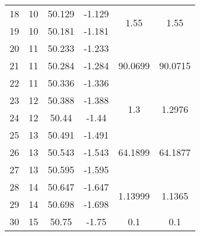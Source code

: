 \documentclass[twocolumn]{autart}
\begin{document}
\begin{table*}[t]
\begin{tabular}{cccccc}
    18    & 10    & 50.129 & -1.129 & \multirow{2}[4]{*}{1.55} & \multirow{2}[4]{*}{1.55} \\
    19    & 10    & 50.181 & -1.181 &       &  \\ \midrule
    20    & 11    & 50.233 & -1.233 & \multirow{3}[6]{*}{90.0699} & \multirow{3}[6]{*}{90.0715} \\
    21    & 11    & 50.284 & -1.284 &       &  \\
    22    & 11    & 50.336 & -1.336 &       &  \\  \midrule
    23    & 12    & 50.388 & -1.388 & \multirow{2}[4]{*}{1.3} & \multirow{2}[4]{*}{1.2976} \\
    24    & 12    & 50.44 & -1.44 &       &  \\  \midrule
    25    & 13    & 50.491 & -1.491 & \multirow{3}[6]{*}{64.1899} & \multirow{3}[6]{*}{64.1877} \\
    26    & 13    & 50.543 & -1.543 &       &  \\
    27    & 13    & 50.595 & -1.595 &       &  \\  \midrule
    28    & 14    & 50.647 & -1.647 & \multirow{2}[4]{*}{1.13999} & \multirow{2}[4]{*}{1.1365} \\
    29    & 14    & 50.698 & -1.698 &       &  \\ \midrule
    30    & 15    & 50.75 & -1.75 & 0.1   & 0.1 \\ 
    \bottomrule
    \end{tabular}\label{unequal_scenario_1}\end{table*}
\begin{table}[htbp]
  \centering
  \caption{Comparision of the results obtained for unequal distribution of fuel cell stacks in different rows using a standard optimization routine and the proposed algorithm. $P_{req}$=75000 W,   	$\phi$=0.8  		 Number of fuel cell stacks = 30. Parameters and optimum current drawn are described in Table \ref{unequal_scenario_1}.}
    \label{unequal_scenario_2}\end{table}
\end{document}
